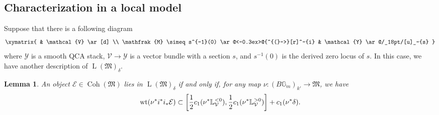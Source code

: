 \documentclass [11pt,oneside,a4paper,mathscr]{amsart}
\makeatletter
\newtheorem{lemma}[thm]{Lemma}
\theoremstyle{definition}
\newcommand{\LL}{\operatorname{L}}
\newcommand{\bgm}{B\mathbb{G}_m}
\newcommand{\Coh}{\operatorname{Coh}}
\newcommand{\inclusion}{\ar@<-0.3ex>@{^{(}->}[r]}
\newcommand{\wt}{\mathrm{wt}}
\makeatother
\begin{document}
\subsection{Characterization in a local model}
Suppose that there is a
following diagram 
\begin{align}\label{dia:zeros}
\xymatrix{
& \mathcal{V} \ar[d] \\
\mathfrak{M} \simeq s^{-1}(0) \inclusion^-{i} & \mathcal{Y} \ar@/_18pt/[u]_-{s}
}
\end{align}
where $\mathcal{Y}$ is a smooth QCA stack, $\mathcal{V} \to \mathcal{Y}$ is a vector bundle 
with a section $s$, and 
$s^{-1}(0)$ is the derived zero locus of $s$.
In this case, we have another description of $\LL(\mathfrak{M})_{\delta}$.
    \begin{lemma}\label{lem:emb}
An object $\mathcal{E} \in \Coh(\mathfrak{M})$ lies in 
$\LL(\mathfrak{M})_{\delta}$ if and only if, for any map $\nu \colon (\bgm)_{k'} \to \mathfrak{M}$, we have 
\begin{align}\notag
    \wt(\nu^{\ast}i^{\ast}i_{\ast}\mathcal{E})
    \subset \left[\frac{1}{2} c_1 (\nu^{\ast}\mathbb{L}_{\mathcal{V}}^{<0}), 
    \frac{1}{2} c_1 (\nu^{\ast}\mathbb{L}_{\mathcal{V}}^{>0})
    \right]+c_1(\nu^{\ast}\delta). 
\end{align}
    \end{lemma}
\end{document}
